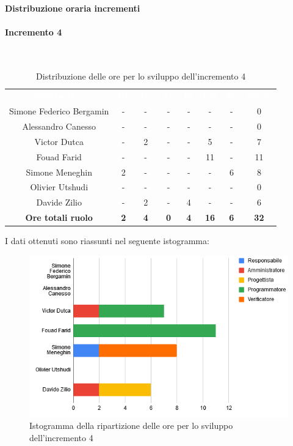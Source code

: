 \paragraph{Distribuzione oraria incrementi}
\paragraph*{Incremento 4} \mbox{} \\
\begin{table}[H]
\centering\renewcommand{\arraystretch}{1.5}
\caption{Distribuzione delle ore per lo sviluppo dell'incremento 4}
\vspace{0.2cm}
\begin{tabular}{ c c c c c c c c }
\rowcolor{redafk}
\textcolor{white}{\textbf{Nominativo}} & \textcolor{white}{\textbf{Re}} &
\textcolor{white}{\textbf{Am}} & \textcolor{white}{\textbf{An}} &
\textcolor{white}{\textbf{Pt}} & \textcolor{white}{\textbf{Pm}} &
\textcolor{white}{\textbf{Ve}} & \textcolor{white}{\textbf{Totale}} \\
Simone Federico Bergamin & - & - & - & - & - & - & 0 \\
Alessandro Canesso & - & - & - & - & - & - & 0\\
Victor Dutca & - & 2 & - & - & 5 & - & 7 \\
Fouad Farid & - & - & - & - & 11 & - & 11 \\
Simone Meneghin & 2 & - & - & - & - & 6 & 8 \\
Olivier Utshudi & - & - & - & - & - & - & 0 \\
Davide Zilio & - & 2 & - & 4 & - & - & 6 \\
\rowcolor{lastrowcolor}
\textbf{Ore totali ruolo} & \textbf{2} & \textbf{4} & \textbf{0} & \textbf{4} & \textbf{16} & \textbf{6} & \textbf{32} \\
\end{tabular}
\end{table}

I dati ottenuti sono riassunti nel seguente istogramma:
\begin{figure}[H]
\centering
\includegraphics[scale=0.60]{img/grafici/tabella_inc4.png}
\caption{Istogramma della ripartizione delle ore per lo sviluppo dell'incremento 4}
\end{figure}

